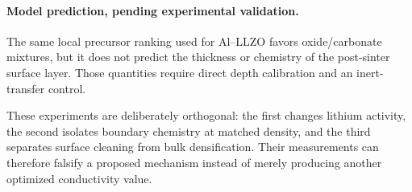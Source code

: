 \paragraph{Model prediction, pending experimental validation.}
The same local precursor ranking used for Al--LLZO favors oxide\slash carbonate mixtures, but it does not predict the thickness or chemistry of the post-sinter surface layer. Those quantities require direct depth calibration and an inert-transfer control.

These experiments are deliberately orthogonal: the first changes lithium activity, the second isolates boundary chemistry at matched density, and the third separates surface cleaning from bulk densification. Their measurements can therefore falsify a proposed mechanism instead of merely producing another optimized conductivity value.
